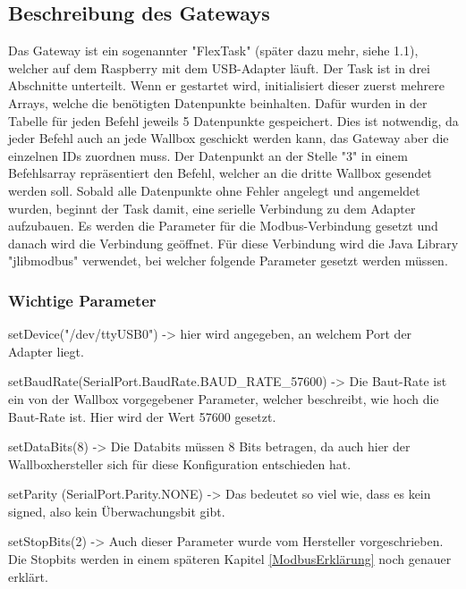 \subsection{Beschreibung des Gateways}
Das Gateway ist ein sogenannter "FlexTask" (später dazu mehr, siehe 1.1), welcher auf dem Raspberry mit dem USB-Adapter läuft. Der Task ist in drei Abschnitte unterteilt. Wenn er gestartet wird, initialisiert dieser zuerst mehrere Arrays, welche die benötigten Datenpunkte beinhalten. Dafür wurden in der Tabelle für jeden Befehl jeweils 5 Datenpunkte gespeichert. Dies ist notwendig, da jeder Befehl auch an jede Wallbox geschickt werden kann, das Gateway aber die einzelnen IDs zuordnen muss. Der Datenpunkt an der Stelle "3" in einem Befehlsarray repräsentiert den Befehl, welcher an die dritte Wallbox gesendet werden soll.  
Sobald alle Datenpunkte ohne Fehler angelegt und angemeldet wurden, beginnt der Task damit, eine serielle Verbindung zu dem Adapter aufzubauen. Es werden die Parameter für die Modbus-Verbindung gesetzt und danach wird die Verbindung geöffnet. Für diese Verbindung wird die Java Library "jlibmodbus" verwendet, bei welcher folgende Parameter gesetzt werden müssen. 

\subsubsection*{Wichtige Parameter}


\begin{compactitem}
  \item setDevice("/dev/ttyUSB0") -> hier wird angegeben, an welchem Port der Adapter liegt.  
  \item setBaudRate(SerialPort.BaudRate.BAUD\_RATE\_57600) -> Die Baut-Rate ist ein von der Wallbox vorgegebener Parameter, welcher beschreibt, wie hoch die Baut-Rate ist. Hier wird der Wert 57600 gesetzt.  
  \item setDataBits(8) -> Die Databits müssen 8 Bits betragen, da auch hier der Wallboxhersteller sich für diese Konfiguration entschieden hat.  
  \item setParity (SerialPort.Parity.NONE) -> Das bedeutet so viel wie, dass es kein signed, also kein Überwachungsbit gibt. 
  \item setStopBits(2) -> Auch dieser Parameter wurde vom Hersteller vorgeschrieben. Die Stopbits werden in einem späteren Kapitel \ref{ModbusErklärung} noch genauer erklärt. 
\end{compactitem}

